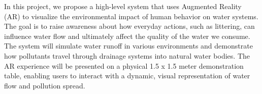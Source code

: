 In this project, we propose a high-level system that uses Augmented Reality (AR) to visualize the environmental impact of human behavior on water systems. The goal is to raise awareness about how everyday actions, such as littering, can influence water flow and ultimately affect the quality of the water we consume. The system will simulate water runoff in various environments and demonstrate how pollutants travel through drainage systems into natural water bodies. The AR experience will be presented on a physical 1.5 x 1.5 meter demonstration table, enabling users to interact with a dynamic, visual representation of water flow and pollution spread.
